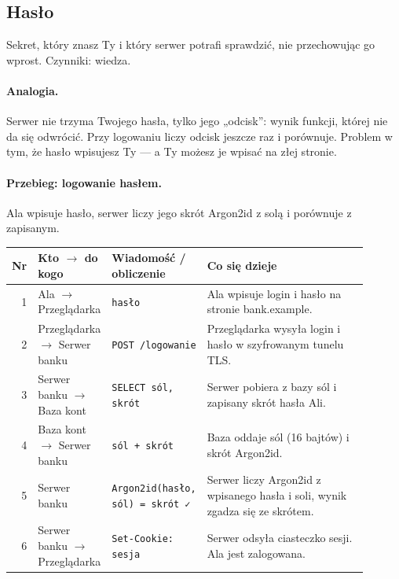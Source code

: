 \subsection{Hasło}
\label{sec:mech-haslo}
Sekret, który znasz Ty i który serwer potrafi sprawdzić, nie przechowując go wprost. Czynniki: wiedza. \cite{N1,N4,N5,X3,X4,A1,P6,X1}

\paragraph{Analogia.} Serwer nie trzyma Twojego hasła, tylko jego „odcisk”: wynik funkcji, której nie da się odwrócić. Przy logowaniu liczy odcisk jeszcze raz i porównuje. Problem w tym, że hasło wpisujesz Ty — a Ty możesz je wpisać na złej stronie.

\paragraph{Przebieg: logowanie hasłem.} Ala wpisuje hasło, serwer liczy jego skrót Argon2id z solą i porównuje z zapisanym.
\begingroup\footnotesize
\begin{longtable}{@{}r p{0.2\linewidth} p{0.24\linewidth} p{0.46\linewidth}@{}}
\toprule
Nr & Kto $\rightarrow$ do kogo & Wiadomość / obliczenie & Co się dzieje \\
\midrule
\endhead
1 & Ala $\rightarrow$ Przeglądarka & \texttt{hasło} & Ala wpisuje login i hasło na stronie bank.example. \\
2 & Przeglądarka $\rightarrow$ Serwer banku & \texttt{POST /logowanie} & Przeglądarka wysyła login i hasło w szyfrowanym tunelu TLS. \\
3 & Serwer banku $\rightarrow$ Baza kont & \texttt{SELECT sól, skrót} & Serwer pobiera z bazy sól i zapisany skrót hasła Ali. \\
4 & Baza kont $\rightarrow$ Serwer banku & \texttt{sól + skrót} & Baza oddaje sól (16 bajtów) i skrót Argon2id. \\
5 & Serwer banku & \texttt{Argon2id(hasło, sól) = skrót ✓} & Serwer liczy Argon2id z wpisanego hasła i soli, wynik zgadza się ze skrótem. \\
6 & Serwer banku $\rightarrow$ Przeglądarka & \texttt{Set-Cookie: sesja} & Serwer odsyła ciasteczko sesji. Ala jest zalogowana. \\
\bottomrule
\end{longtable}
\endgroup

